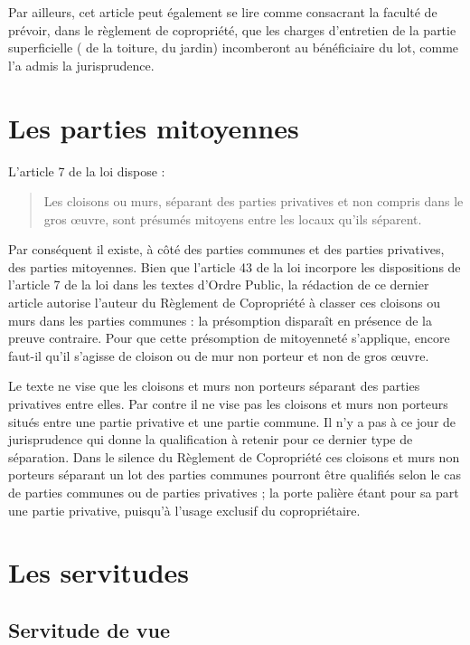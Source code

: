 			Par ailleurs, cet article peut également se lire comme consacrant la faculté de prévoir, dans le règlement
			de copropriété, que les charges d’entretien de la partie superficielle ( de la toiture, du jardin) incomberont
			au bénéficiaire du lot, comme l’a admis la jurisprudence.

\section{Les parties mitoyennes}

	L'article 7 de la loi dispose :
	\begin{quote}
		Les cloisons ou murs, séparant des parties privatives et non compris dans le gros œuvre, sont présumés mitoyens entre les locaux qu'ils séparent.
	\end{quote}
	
	Par conséquent il existe, à côté des parties communes et des parties privatives, des parties mitoyennes.
	Bien que l'article 43 de la loi incorpore les dispositions de l'article 7 de la loi dans les textes d'Ordre Public,
	la rédaction de ce dernier article autorise l'auteur du Règlement de Copropriété à classer ces cloisons ou
	murs dans les parties communes : la présomption disparaît en présence de la preuve contraire.
	Pour que cette présomption de mitoyenneté s'applique, encore faut-il qu’il s’agisse de cloison ou de mur
	non porteur et non de gros œuvre.
	
	Le texte ne vise que les cloisons et murs non porteurs séparant des parties privatives entre elles. Par contre
	il ne vise pas les cloisons et murs non porteurs situés entre une partie privative et une partie commune. Il
	n’y a pas à ce jour de jurisprudence qui donne la qualification à retenir pour ce dernier type de séparation.
	Dans le silence du Règlement de Copropriété ces cloisons et murs non porteurs séparant un lot des parties
	communes pourront être qualifiés selon le cas de parties communes ou de parties privatives ; la porte
	palière étant pour sa part une partie privative, puisqu’à l’usage exclusif du copropriétaire.

\section{Les servitudes}

	\subsection{Servitude de vue}

